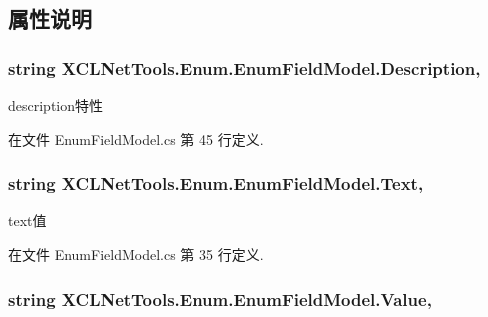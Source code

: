 \subsection{属性说明}
\hypertarget{class_x_c_l_net_tools_1_1_enum_1_1_enum_field_model_a182875468bc25ee9c6adb98582e3683e}{
\subsubsection[{Description}]{\setlength{\rightskip}{0pt plus 5cm}string X\-C\-L\-Net\-Tools.\-Enum.\-Enum\-Field\-Model.\-Description\hspace{0.3cm}{\ttfamily [get]}, {\ttfamily [set]}}}\label{class_x_c_l_net_tools_1_1_enum_1_1_enum_field_model_a182875468bc25ee9c6adb98582e3683e}


description特性 



在文件 Enum\-Field\-Model.\-cs 第 45 行定义.

\hypertarget{class_x_c_l_net_tools_1_1_enum_1_1_enum_field_model_acbbc7df1972c0c70dfcf43413da878a8}{
\subsubsection[{Text}]{\setlength{\rightskip}{0pt plus 5cm}string X\-C\-L\-Net\-Tools.\-Enum.\-Enum\-Field\-Model.\-Text\hspace{0.3cm}{\ttfamily [get]}, {\ttfamily [set]}}}\label{class_x_c_l_net_tools_1_1_enum_1_1_enum_field_model_acbbc7df1972c0c70dfcf43413da878a8}


text值 



在文件 Enum\-Field\-Model.\-cs 第 35 行定义.

\hypertarget{class_x_c_l_net_tools_1_1_enum_1_1_enum_field_model_a907462fed405f7065a6fc013cc919e29}{
\subsubsection[{Value}]{\setlength{\rightskip}{0pt plus 5cm}string X\-C\-L\-Net\-Tools.\-Enum.\-Enum\-Field\-Model.\-Value\hspace{0.3cm}{\ttfamily [get]}, {\ttfamily [set]}}}\label{class_x_c_l_net_tools_1_1_enum_1_1_enum_field_model_a907462fed405f7065a6fc013cc919e29}


